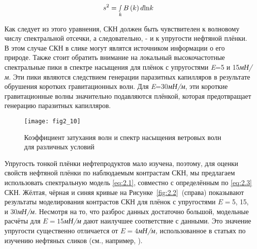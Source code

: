 \begin{equation} \label{eq:2.3} 
s^{2} =\mathop{\smallint }\limits_{k}^{} B\left(k\right)d{\rm ln}k 
\end{equation} 


Как следует из этого уравнения, СКН должен быть чувствителен к волновому числу спектральной отсечки, а следовательно, - и к упругости нефтяной плёнки. В этом случае СКН в слике могут являтся источником информации о его природе. Также стоит обратить внимание на локальный высокочастотные спектральные пики в спектре насыщения для плёнок с упругостями \textit{E}=5 и 15\textit{мН/м}. Эти пики являются следствием генерации паразитных капилляров в результате обрушения коротких гравитационных волн. Для \textit{E}=30\textit{мН/м}, эти короткие гравитационные волны значительно подавляются плёнкой, которая предотвращает генерацию паразитных капилляров.



\begin{figure}[!ht]
   	\centering
	{\texttt{[image: fig2\_10]}}
    \\
    \caption{Коэффициент затухания волн и спектр насыщения ветровых волн для различных условий}
    \label{fig:2.10}
\end{figure}


Упругость тонкой плёнки нефтепродуктов мало изучена, поэтому, для оценки свойств нефтяной плёнки по наблюдаемым контрастам СКН, мы предлагаем использовать спектральную модель \eqref{eq:2.1}, совместно с определённым по \eqref{eq:2.3} СКН. Жёлтая, чёрная и синяя кривые на Рисунке~\ref{fig:2.2}~(справа) показывают результаты моделирования контрастов СКН для плёнок с упругостями $E=$5, 15, и 30\textit{мН/м.} Несмотря на то, что разброс данных достаточно большой, модельные расчёты для $E=15$\textit{мН/м} дают наилучшее соответствие с данными. Это значение упругости существенно отличается от $E=4$\textit{мН/м,} использованное в статьях по изучению нефтяных сликов (см., например, \citep{2008}).

